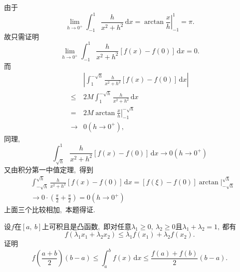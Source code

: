 	\begin{solution}
		由于
		$$\lim\limits_{h\rightarrow0^+}\int_{-1}^{1}\frac{h}{x^2+h^2}\,\text{d}x=\left.\arctan\frac{x}{h}\right|^1_{-1}=\pi.$$
		故只需证明
		$$\lim\limits_{h\rightarrow0^+}\int_{-1}^{1}\frac{h}{x^2+h^2}\left[f(x)-f(0)\right]\,\text{d}x=0.$$
		而
		\begin{align*}
			&\left|\int_{1}^{-\sqrt{h}}\frac{h}{x^2+h^2}\left[f(x)-f(0)\right]\,\text{d}x\right|\\
			\le &2M\int_{1}^{-\sqrt{h}}\frac{h}{x^2+h^2}\,\text{d}x\\
			=&2M\left.\arctan\frac{x}{h}\right|_{-1}^{-\sqrt{h}}\\
			\rightarrow&0(h\rightarrow0^+),\ 
		\end{align*}
		同理,\ $$\int_{\sqrt{h}}^{1}\frac{h}{x^2+h^2}\left[f(x)-f(0)\right]\,\text{d}x\rightarrow0(h\rightarrow0^+)$$
		又由积分第一中值定理,\ 得到
		\begin{align*}
			&\int_{-\sqrt{h}}^{\sqrt{h}}\frac{h}{x^2+h^2}\left[f(x)-f(0)\right]\,\text{d}x=\left[f(\xi)-f(0)\right]\left.\arctan\right|^{\sqrt{h}}_{-\sqrt{h}}\\
			&\rightarrow0\cdot\left(\frac{\pi}{2}+\frac{\pi}{2}\right)=0(h\rightarrow0^+)
		\end{align*}
		上面三个比较相加,\ 本题得证. 
	\end{solution}
	\newpage
	\begin{problem}
		设$f$在$\left[a,\ b\right]$上可积且是凸函数,\ 即对任意$\lambda_1\ge 0,\ \lambda_2\ge 0$且$\lambda_1+\lambda_2=1,\ $都有
		$$f(\lambda_1x_1+\lambda_2x_2)\le \lambda_1f(x_1)+\lambda_2f(x_2).$$
		证明
		$$f\left(\frac{a+b}{2}\right)(b-a)\le \int_{a}^{b}f(x)\,\text{d}x\le\frac{f(a)+f(b)}{2}(b-a).$$
	\end{problem}
